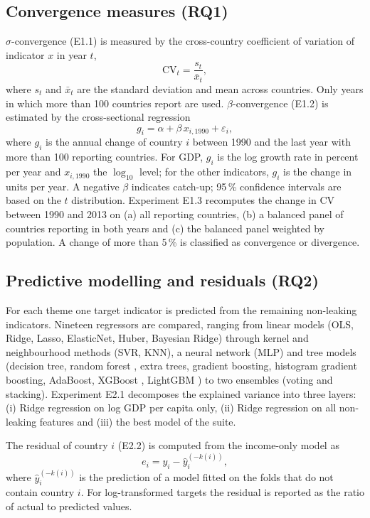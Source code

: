 \documentclass[11pt,a4paper]{article}
\begin{document}
\subsection{Convergence measures (RQ1)}
$\sigma$-convergence (E1.1) is measured by the cross-country coefficient of variation of indicator $x$ in year $t$,
\begin{equation}
\mathrm{CV}_t = \frac{s_t}{\bar{x}_t},
\end{equation}
where $s_t$ and $\bar{x}_t$ are the standard deviation and mean across countries. Only years in which more than 100 countries report are used. $\beta$-convergence (E1.2) is estimated by the cross-sectional regression
\begin{equation}
g_i = \alpha + \beta\, x_{i,1990} + \varepsilon_i,
\end{equation}
where $g_i$ is the annual change of country $i$ between 1990 and the last year with more than 100 reporting countries. For GDP, $g_i$ is the log growth rate in percent per year and $x_{i,1990}$ the $\log_{10}$ level; for the other indicators, $g_i$ is the change in units per year. A negative $\beta$ indicates catch-up; 95\,\% confidence intervals are based on the $t$ distribution. Experiment E1.3 recomputes the change in CV between 1990 and 2013 on (a) all reporting countries, (b) a balanced panel of countries reporting in both years and (c) the balanced panel weighted by population. A change of more than 5\,\% is classified as convergence or divergence.

\subsection{Predictive modelling and residuals (RQ2)}
For each theme one target indicator is predicted from the remaining non-leaking indicators. Nineteen regressors are compared, ranging from linear models (OLS, Ridge, Lasso, ElasticNet, Huber, Bayesian Ridge) through kernel and neighbourhood methods (SVR, KNN), a neural network (MLP) and tree models (decision tree, random forest \cite{breiman}, extra trees, gradient boosting, histogram gradient boosting, AdaBoost, XGBoost \cite{xgb}, LightGBM \cite{lgbm}) to two ensembles (voting and stacking). Experiment E2.1 decomposes the explained variance into three layers: (i) Ridge regression on log GDP per capita only, (ii) Ridge regression on all non-leaking features and (iii) the best model of the suite.

The residual of country $i$ (E2.2) is computed from the income-only model as
\begin{equation}
e_i = y_i - \hat{y}_i^{(-k(i))},
\end{equation}
where $\hat{y}_i^{(-k(i))}$ is the prediction of a model fitted on the folds that do not contain country $i$. For log-transformed targets the residual is reported as the ratio of actual to predicted values.
\end{document}

